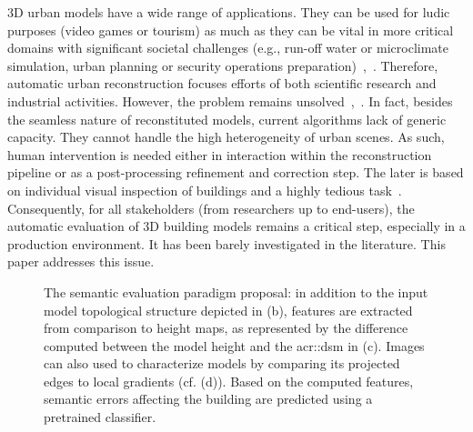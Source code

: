 \documentclass[runningheads]{llncs}
\begin{document}
    3D urban models have a wide range of applications. They can be used for ludic purposes (video games or tourism) as much as they can be vital in more critical domains with significant societal challenges (e.g., run-off water or microclimate simulation, urban planning or security operations preparation)~\cite{Biljecki2015},~\cite{Musialski2012}. Therefore, automatic urban reconstruction focuses efforts of both scientific research and industrial activities. However, the problem remains unsolved~\cite{Musialski2012},~\cite{rottensteiner2014results}. In fact, besides the seamless nature of reconstituted models, current algorithms lack of generic capacity. They cannot handle the high heterogeneity of urban scenes. As such, human intervention is needed either in interaction within the reconstruction pipeline or as a post-processing refinement and correction step. The later is based on individual visual inspection of buildings and a highly tedious task~\cite{Musialski2012}. Consequently, for all stakeholders (from researchers up to end-users), the automatic evaluation of 3D building models remains a critical step, especially in a production environment. It has been barely investigated in the literature. This paper addresses this issue.

	\begin{figure}
        \begin{center}
            
           \vspace{-1.3cm} \caption{\label{fig::pipeline} The semantic evaluation paradigm proposal: in addition to the input model topological structure depicted in (b), features are extracted from comparison to height maps, as represented by the difference computed between the model height and the \acrlong{acr::dsm} in (c). Images can also used to characterize models by comparing its projected edges to local gradients (cf. (d)). Based on the computed features, semantic errors affecting the building are predicted using a pretrained classifier.}
        \end{center}
    \end{figure}
    
\end{document}
